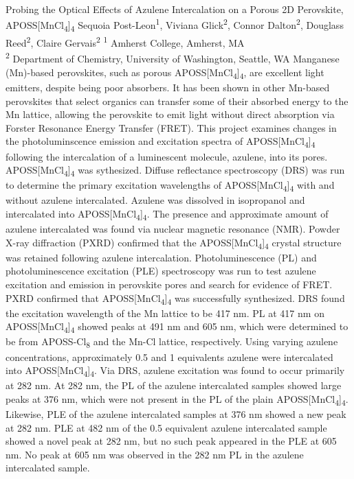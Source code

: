 \makeabstract
    {
    Probing the Optical Effects of Azulene Intercalation on a Porous 2D Perovskite, APOSS[MnCl\textsubscript{4}]\textsubscript{4}
    }
    {
    Sequoia Post-Leon\textsuperscript{1}, Viviana Glick\textsuperscript{2}, Connor Dalton\textsuperscript{2}, Douglass Reed\textsuperscript{2}, Claire Gervais\textsuperscript{2}
    }
    {
    \textsuperscript{1} Amherst College, Amherst, MA\\
\textsuperscript{2} Department of Chemistry, University of Washington, Seattle, WA 
    }
    {
    Manganese (Mn)-based perovskites, such as porous APOSS[MnCl\textsubscript{4}]\textsubscript{4}, are excellent light emitters, despite being poor absorbers. It has been shown in other Mn-based perovskites that select organics can transfer some of their absorbed energy to the Mn lattice, allowing the perovskite to emit light without direct absorption via Forster Resonance Energy Transfer (FRET). This project examines changes in the photoluminscence emission and excitation spectra of APOSS[MnCl\textsubscript{4}]\textsubscript{4} following the intercalation of a luminescent molecule, azulene, into its pores. 
    }
    {
    APOSS[MnCl\textsubscript{4}]\textsubscript{4} was sythesized. Diffuse reflectance spectroscopy (DRS) was run to determine the primary excitation wavelengths of APOSS[MnCl\textsubscript{4}]\textsubscript{4} with and without azulene intercalated. Azulene was dissolved in isopropanol and intercalated into APOSS[MnCl\textsubscript{4}]\textsubscript{4}. The presence and approximate amount of azulene intercalated was found via nuclear magnetic resonance (NMR). Powder X-ray diffraction (PXRD) confirmed that the APOSS[MnCl\textsubscript{4}]\textsubscript{4} crystal structure was retained following azulene intercalation. Photoluminescence (PL) and photoluminescence excitation (PLE) spectroscopy was run to test azulene excitation and emission in perovskite pores and search for evidence of FRET. 
    }
    {
    PXRD confirmed that APOSS[MnCl\textsubscript{4}]\textsubscript{4} was successfully synthesized. DRS found the excitation wavelength of the Mn lattice to be 417 nm. PL at 417 nm on APOSS[MnCl\textsubscript{4}]\textsubscript{4} showed peaks at 491 nm and 605 nm, which were determined to be from APOSS-Cl\textsubscript{8} and the Mn-Cl lattice, respectively. Using varying azulene concentrations, approximately 0.5 and 1 equivalents azulene were intercalated into APOSS[MnCl\textsubscript{4}]\textsubscript{4}. Via DRS, azulene excitation was found to occur primarily at 282 nm. At 282 nm, the PL of the azulene intercalated samples showed large peaks at 376 nm, which were not present in the PL of the plain APOSS[MnCl\textsubscript{4}]\textsubscript{4}. Likewise, PLE of the azulene intercalated samples at 376 nm showed a new peak at 282 nm. PLE at 482 nm of the 0.5 equivalent azulene intercalated sample showed a novel peak at 282 nm, but no such peak appeared in the PLE at 605 nm. No peak at 605 nm was observed in the 282 nm PL in the azulene intercalated sample. 
    }
